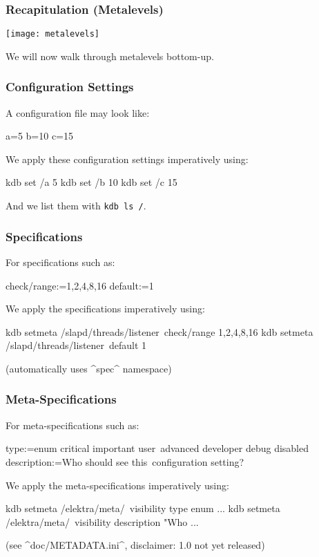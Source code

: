 \begin{frame}
	\frametitle{Recapitulation (Metalevels)}
	\texttt{[image: metalevels]}

	We will now walk through metalevels bottom-up.
\end{frame}

\begin{frame}[fragile]
	\frametitle{Configuration Settings}

	A configuration file may look like:

	\begin{code}[language=CfgElektra]
	a=5
	b=10
	c=15
	\end{code}

	We apply these configuration settings imperatively using:

	\begin{code}[language=bash]
	kdb set /a 5
	kdb set /b 10
	kdb set /c 15
	\end{code}

	And we list them with \lstinline[language=bash,morekeywords={ls},showspaces=no]^kdb ls /^.
\end{frame}

\begin{frame}[fragile]
	\frametitle{Specifications}
	For specifications such as:

	\begin{code}
	  check/range:=1,2,4,8,16
	  default:=1
	\end{code}

	We apply the specifications imperatively using:

	\begin{code}[language=bash,morekeywords={setmeta}]
	kdb setmeta /slapd/threads/listener\
		check/range 1,2,4,8,16
	kdb setmeta /slapd/threads/listener\
	       	default 1
	\end{code}

	(automatically uses ^spec^ namespace)
\end{frame}

\begin{frame}[fragile]
	\frametitle{Meta-Specifications}
	For meta-specifications such as:

	\small
	\begin{code}
	[visibility]
	type:=enum critical important user\
	      advanced developer debug disabled
	description:=Who should see this\
	     configuration setting?
	\end{code}

	We apply the meta-specifications imperatively using:

	\begin{code}[language=bash,morekeywords={setmeta}]
	kdb setmeta /elektra/meta/\
		visibility type enum ...
	kdb setmeta /elektra/meta/\
		visibility description "Who ...
	\end{code}

	(see ^doc/METADATA.ini^, disclaimer: 1.0 not yet released)
\end{frame}

